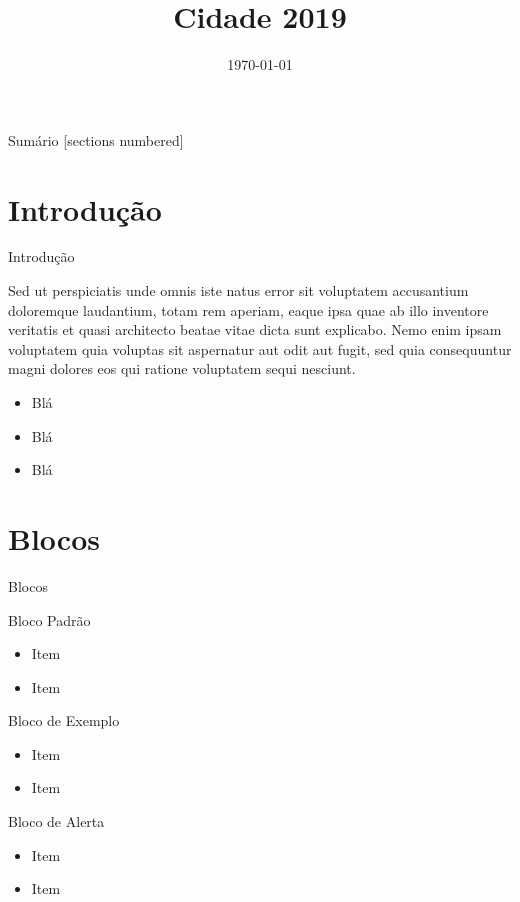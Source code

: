 \documentclass[aspectratio=1610]{beamer}
\title{Cidade 2019}
\date{\today}
\begin{document}
	
	\begin{frame}{}
		\titlepage
		\thispagestyle{empty}
	\end{frame}
	
	\begin{frame}{Sumário}
		[sections numbered]
		\tableofcontents[hideallsubsections]
	\end{frame}

	
\section{Introdução}
\begin{frame}{Introdução}
	
	Sed ut perspiciatis unde omnis iste natus error sit voluptatem accusantium doloremque laudantium, totam rem aperiam, eaque ipsa quae ab illo inventore veritatis et quasi architecto beatae vitae dicta sunt explicabo. Nemo enim ipsam voluptatem quia voluptas sit aspernatur aut odit aut fugit, sed quia consequuntur magni dolores eos qui ratione voluptatem sequi nesciunt. 
	
	\begin{itemize}
		\item Blá
		\item Blá
		\item Blá
	\end{itemize}

\end{frame}


\section{Blocos}

\begin{frame}{Blocos}

	\begin{block}{Bloco Padrão}
		\begin{itemize}
			\item Item
			\item Item
		\end{itemize}
	\end{block}
	
	
	\begin{exampleblock}{Bloco de Exemplo}
		\begin{itemize}
			\item Item
			\item Item
		\end{itemize}
	\end{exampleblock}
	
	\begin{alertblock}{Bloco de Alerta}
		\begin{itemize}
			\item Item
			\item Item
		\end{itemize}
	\end{alertblock}

\end{frame}
\end{document}
